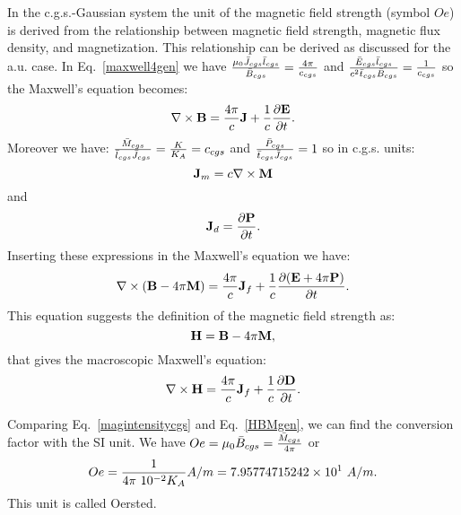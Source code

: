 \documentclass[12pt,a4paper]{article}
\def\htoh{7.95774715242\times 10^{1}}
\begin{document}
{\color{orange} In the c.g.s.-Gaussian system the unit of the magnetic field
strength (symbol $Oe$) is derived from the relationship between 
magnetic field strength,
magnetic flux density, and magnetization. This relationship can be derived
as discussed for the a.u. case. In Eq.~\ref{maxwell4gen} we have
${\mu_0 \bar J_{cgs} \bar l_{cgs} \over \bar B_{cgs}}={4 \pi \over c_{cgs}}$
and ${\bar E_{cgs} \bar l_{cgs} \over c^2 \bar t_{cgs} \bar B_{cgs}}=
{1\over c_{cgs}}$ so the Maxwell's equation becomes:
\begin{equation}
\nabla \times {\bf B}= {4 \pi \over c} {\bf J} + {1\over c} 
{\partial {\bf E} \over \partial t}.
\label{maxwell4cgs}
\end{equation}
Moreover we have:
${\bar M_{cgs} \over \bar l_{cgs} \bar J_{cgs}}={K\over K_A}=c_{cgs}$ and
${\bar P_{cgs} \over \bar t_{cgs} \bar J_{cgs}}=1$ so in c.g.s. units:
\begin{equation}
{\bf J}_m= c \nabla \times {\bf M}
\end{equation}
and
\begin{equation}
{\bf J}_d={\partial {\bf P} \over \partial t}.
\end{equation}
Inserting these expressions in the Maxwell's equation we have:
\begin{equation}
\nabla \times ({\bf B} -4\pi {\bf M})= 
{4 \pi\over c} {\bf J}_f +  {1\over c} {\partial ({\bf E}+4\pi {\bf P}) \over \partial t}.
\label{maxwell4cgs1}
\end{equation}
This equation suggests the definition of the magnetic field strength as:
\begin{equation}
{\bf H}={\bf B} -4\pi {\bf M},
\label{magintensitycgs}
\end{equation}
that gives the macroscopic Maxwell's equation:
\begin{equation}
\nabla \times {\bf H}= 
{4 \pi \over c} {\bf J}_f +  {1\over c}{\partial {\bf D} \over \partial t}.
\end{equation}

Comparing Eq.~\ref{magintensitycgs} and Eq.~\ref{HBMgen}, we can find the 
conversion factor with the SI unit.
We have $Oe=\mu_0 \bar B_{cgs}={\bar M_{cgs} \over 4 \pi}$ or
\begin{equation}
Oe= {1\over 4 \pi\ 10^{-2} K_A} A/m=\htoh\ A/m. 
\end{equation}
This unit is called Oersted.
}
\\
\end{document}
